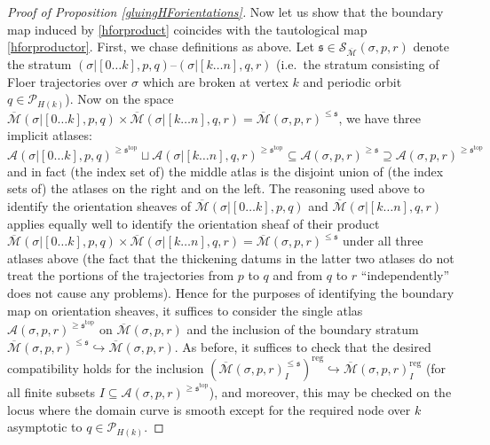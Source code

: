 \documentclass[12pt]{article}
\theoremstyle{definition}
\theoremstyle{remark}
\numberwithin{equation}{subsection}
\newcommand{\s}{\mathfrak s}
\newcommand{\PPP}{\mathcal P}
\newcommand{\SSS}{\mathcal S}
\newcommand{\ttop}{\mathrm{top}}
\newcommand{\A}{\mathcal A}
\newcommand{\Mbar}{\overline{\mathcal M}}
\newcommand{\reg}{\mathrm{reg}}
\begin{document}
\begin{proof}[Proof of Proposition \ref{gluingHForientations}]
Now let us show that the boundary map induced by \eqref{hforproduct} coincides with the tautological map \eqref{hforproductor}.  First, we chase definitions as above.  Let $\s\in\SSS_{\Mbar}(\sigma,p,r)$ denote the stratum $(\sigma|[0\ldots k],p,q)$--$(\sigma|[k\ldots n],q,r)$ (i.e.\ the stratum consisting of Floer trajectories over $\sigma$ which are broken at vertex $k$ and periodic orbit $q\in\PPP_{H(k)}$).  Now on the space $\Mbar(\sigma|[0\ldots k],p,q)\times\Mbar(\sigma|[k\ldots n],q,r)=\Mbar(\sigma,p,r)^{\leq\s}$, we have three implicit atlases:
\begin{equation*}
\A(\sigma|[0\ldots k],p,q)^{\geq\s^\ttop}\sqcup\A(\sigma|[k\ldots n],q,r)^{\geq\s^\ttop}\subseteq\A(\sigma,p,r)^{\geq\s}\supseteq\A(\sigma,p,r)^{\geq\s^\ttop}
\end{equation*}
and in fact (the index set of) the middle atlas is the disjoint union of (the index sets of) the atlases on the right and on the left.  The reasoning used above to identify the orientation sheaves of $\Mbar(\sigma|[0\ldots k],p,q)$ and $\Mbar(\sigma|[k\ldots n],q,r)$ applies equally well to identify the orientation sheaf of their product $\Mbar(\sigma|[0\ldots k],p,q)\times\Mbar(\sigma|[k\ldots n],q,r)=\Mbar(\sigma,p,r)^{\leq\s}$ under all three atlases above (the fact that the thickening datums in the latter two atlases do not treat the portions of the trajectories from $p$ to $q$ and from $q$ to $r$ ``independently'' does not cause any problems).  Hence for the purposes of identifying the boundary map on orientation sheaves, it suffices to consider the single atlas $\A(\sigma,p,r)^{\geq\s^\ttop}$ on $\Mbar(\sigma,p,r)$ and the inclusion of the boundary stratum $\Mbar(\sigma,p,r)^{\leq\s}\hookrightarrow\Mbar(\sigma,p,r)$.  As before, it suffices to check that the desired compatibility holds for the inclusion $(\Mbar(\sigma,p,r)^{\leq\s}_I)^\reg\hookrightarrow\Mbar(\sigma,p,r)_I^\reg$ (for all finite subsets $I\subseteq\A(\sigma,p,r)^{\geq\s^\ttop}$), and moreover, this may be checked on the locus where the domain curve is smooth except for the required node over $k$ asymptotic to $q\in\PPP_{H(k)}$.


\end{proof}
\end{document}
